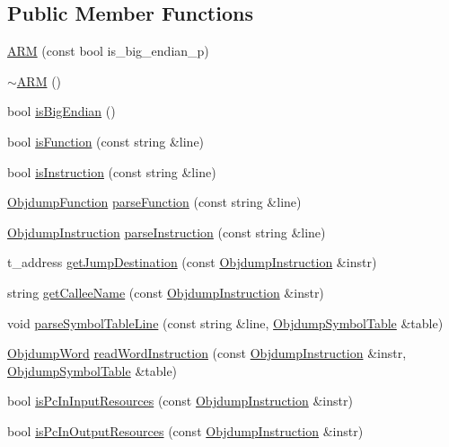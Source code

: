 \subsection*{Public Member Functions}
\begin{DoxyCompactItemize}
\item 
\hyperlink{classARM_a2b446b24478914f836c90c1aea2cb7da}{A\+RM} (const bool is\+\_\+big\+\_\+endian\+\_\+p)
\item 
\hyperlink{classARM_aee5c7c910009cb5d6fa8a81f8ac23be0}{$\sim$\+A\+RM} ()
\item 
bool \hyperlink{classARM_ae86effb7574c3627cd114ec35e5bd096}{is\+Big\+Endian} ()
\item 
bool \hyperlink{classARM_a97cd03133ef631d78cc567c8ded65433}{is\+Function} (const string \&line)
\item 
bool \hyperlink{classARM_abb7b6e518a9d8cb404ca7a30ad6e0326}{is\+Instruction} (const string \&line)
\item 
\hyperlink{classObjdumpFunction}{Objdump\+Function} \hyperlink{classARM_a0f6b3ef390259fd4754cab9752609a20}{parse\+Function} (const string \&line)
\item 
\hyperlink{classObjdumpInstruction}{Objdump\+Instruction} \hyperlink{classARM_a386a5c3f261a13e7b4a5cd4a5b08f289}{parse\+Instruction} (const string \&line)
\item 
t\+\_\+address \hyperlink{classARM_ae889878d4d427bda74ca75645ca0f35a}{get\+Jump\+Destination} (const \hyperlink{classObjdumpInstruction}{Objdump\+Instruction} \&instr)
\item 
string \hyperlink{classARM_aefb97cfd945153e713c1303e467f9190}{get\+Callee\+Name} (const \hyperlink{classObjdumpInstruction}{Objdump\+Instruction} \&instr)
\item 
void \hyperlink{classARM_a894de997c1cde8f31a2e08e6a0c0487d}{parse\+Symbol\+Table\+Line} (const string \&line, \hyperlink{classObjdumpSymbolTable}{Objdump\+Symbol\+Table} \&table)
\item 
\hyperlink{classObjdumpWord}{Objdump\+Word} \hyperlink{classARM_ac39db2497e0931f632be7c57ecfc932a}{read\+Word\+Instruction} (const \hyperlink{classObjdumpInstruction}{Objdump\+Instruction} \&instr, \hyperlink{classObjdumpSymbolTable}{Objdump\+Symbol\+Table} \&table)
\item 
bool \hyperlink{classARM_a3ead2b53ee35931a70471d265c5cc449}{is\+Pc\+In\+Input\+Resources} (const \hyperlink{classObjdumpInstruction}{Objdump\+Instruction} \&instr)
\item 
bool \hyperlink{classARM_a664d4db9519b9a24f107cf3f23974453}{is\+Pc\+In\+Output\+Resources} (const \hyperlink{classObjdumpInstruction}{Objdump\+Instruction} \&instr)

\end{DoxyCompactItemize}
